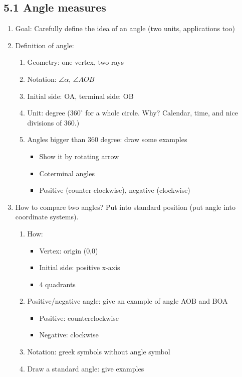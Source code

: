 \documentclass{article}
\begin{document}
\subsection{5.1 Angle measures}
\begin{enumerate}  

\item Goal: Carefully define the idea of an angle (two units, applications too)

\item Definition of angle:  
\begin{enumerate}
\item Geometry: one vertex, two rays
\item Notation: $\angle \alpha$, $\angle AOB$
\item Initial side: OA, terminal side: OB
\item Unit: degree ($360^\circ$ for a whole circle. Why? Calendar, time, and nice divisions of 360.)
\item Angles bigger than 360 degree: draw some examples 
\begin{itemize}
\item Show it by rotating arrow
\item Coterminal angles
\item Positive (counter-clockwise), negative (clockwise)
\end{itemize}
\end{enumerate}
\item How to compare two angles? Put into standard position (put angle into coordinate systems).
\begin{enumerate}
\item How:
\begin{itemize}
\item Vertex: origin (0,0)
\item Initial side: positive x-axis
\item 4 quadrants
\end{itemize}	 
\item Positive/negative angle: give an example of angle AOB and BOA
\begin{itemize}
\item Positive: counterclockwise
\item Negative: clockwise
\end{itemize}
\item Notation: greek symbols without angle symbol
\item Draw a standard angle: give examples

\end{enumerate}
\end{enumerate}
\end{document}

